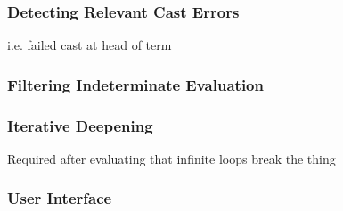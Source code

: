 \subsubsection{Detecting Relevant Cast Errors}
i.e. failed cast at head of term
\subsubsection{Filtering Indeterminate Evaluation}

\subsubsection{Iterative Deepening}
Required after evaluating that infinite loops break the thing
\subsubsection{User Interface}


